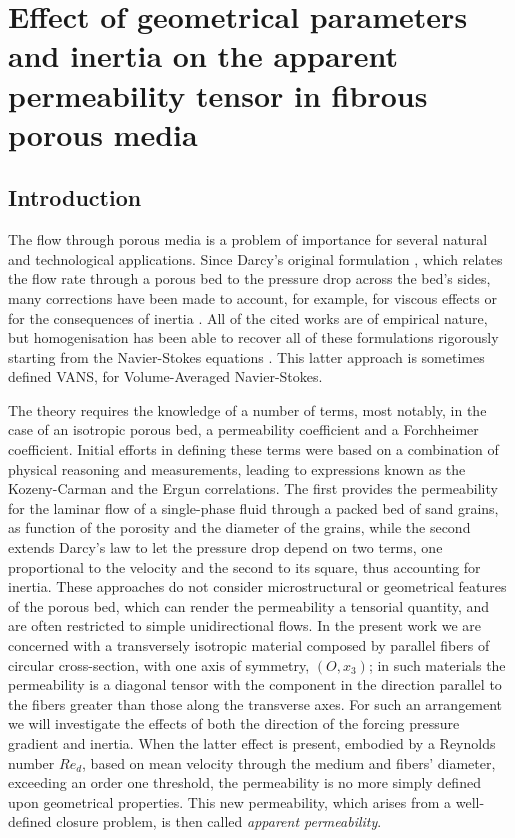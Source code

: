 \chapter{Effect of geometrical parameters and inertia on the apparent permeability tensor in fibrous porous media}



\section{Introduction}


The flow through porous media is a problem of importance for several natural and technological applications. Since Darcy's original
formulation \cite{darcy}, which relates the flow rate through a porous bed to the pressure drop across the bed's sides, many
corrections have been made to account, for example, for viscous effects \cite{brinkman} or for the consequences of inertia \cite{forchheimer}.  
All of the cited works are of empirical nature, but homogenisation has been able to recover all of these
formulations rigorously starting from the Navier-Stokes equations \cite{whitaker2013method}. This latter approach is sometimes defined 
VANS, for Volume-Averaged Navier-Stokes.

The theory requires the knowledge of a number of terms, most notably, in the case of an isotropic porous bed, a permeability
coefficient and a Forchheimer coefficient. Initial efforts in defining these terms were based on a combination of physical
reasoning and measurements, leading to  expressions known as the Kozeny-Carman \cite{kozeny, carman} and the Ergun \cite{ergun}
correlations. The first provides the permeability for the laminar flow of a single-phase fluid through a packed bed of sand grains, 
as function of the porosity and the diameter of the grains, while the second extends Darcy's law to let the pressure drop depend on 
two terms, one proportional to the velocity and the second to its square, thus accounting for inertia. These approaches do not consider 
microstructural or geometrical features of the porous bed, which can render the permeability a tensorial quantity, and are often restricted 
to simple unidirectional flows.  In the present work we are concerned with a transversely isotropic material composed by parallel
fibers of circular cross-section, with one axis of symmetry, $(O,x_3)$; in such materials the permeability is a diagonal tensor
with the component in the direction parallel to the fibers greater than those along the transverse axes. For such an arrangement
we will investigate the effects of both the direction of the forcing pressure gradient and inertia. When the latter effect is present,
embodied by a Reynolds number $Re_d$, based on mean velocity through the medium and fibers' diameter, exceeding an order one threshold, 
the permeability is no more simply defined upon geometrical properties. This new permeability, which arises from a well-defined closure
problem, is then called \emph{apparent permeability}.

